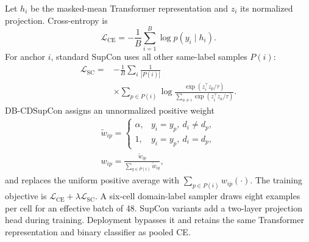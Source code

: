 Let $h_i$ be the masked-mean Transformer representation and $z_i$ its normalized projection. Cross-entropy is
\begin{equation}
\mathcal{L}_{\mathrm{CE}}=-\frac{1}{B}\sum_{i=1}^{B}\log p(y_i\mid h_i).
\end{equation}
For anchor $i$, standard SupCon uses all other same-label samples $P(i)$:
\begin{equation}
\begin{split}
\mathcal{L}_{\mathrm{SC}}={}&
-\frac{1}{B}\sum_i\frac{1}{|P(i)|}\\[-2pt]
&\times\sum_{p\in P(i)}\log
\frac{\exp(z_i^\top z_p/\tau)}
{\sum_{a\neq i}\exp(z_i^\top z_a/\tau)}.
\end{split}
\end{equation}
DB-CDSupCon assigns an unnormalized positive weight
\begin{equation}
\begin{aligned}
\tilde w_{ip}=
\begin{cases}
\alpha,& y_i=y_p,\ d_i\neq d_p,\\
1,& y_i=y_p,\ d_i=d_p,
\end{cases}\\[-2pt]
w_{ip}=\frac{\tilde w_{ip}}{\sum_{q\in P(i)}\tilde w_{iq}},
\end{aligned}
\end{equation}
and replaces the uniform positive average with $\sum_{p\in P(i)}w_{ip}(\cdot)$. The training objective is $\mathcal{L}_{\mathrm{CE}}+\lambda\mathcal{L}_{\mathrm{SC}}$. A six-cell domain-label sampler draws eight examples per cell for an effective batch of 48. SupCon variants add a two-layer projection head during training. Deployment bypasses it and retains the same Transformer representation and binary classifier as pooled CE.
